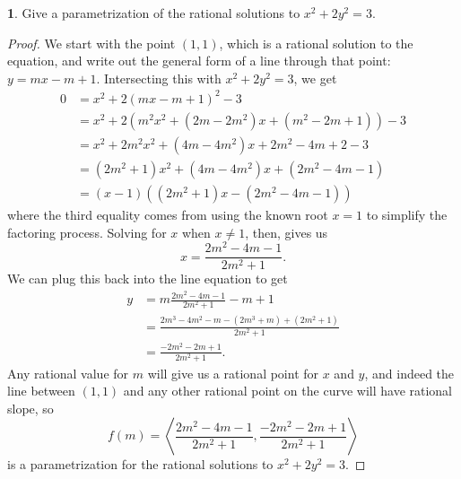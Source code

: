 \documentclass[12pt]{article}
\theoremstyle{definition}
\newtheorem{ex}{}
\begin{document}
\begin{ex}
	Give a parametrization of the rational solutions to $x^2 + 2y^2 = 3$.
\end{ex}
\begin{proof}
	We start with the point $(1, 1)$, which is a rational solution to the equation, and write out the general form of a line through that point: $y = mx - m + 1$.
	Intersecting this with $x^2 + 2y^2 = 3$, we get \begin{align*}
		0 & = x^2 + 2(mx - m + 1)^2 - 3                           \\
		  & = x^2 + 2(m^2x^2 + (2m - 2m^2)x + (m^2 - 2m + 1)) - 3 \\
		  & = x^2 + 2m^2x^2 + (4m - 4m^2)x + 2m^2 - 4m + 2 - 3    \\
		  & = (2m^2 + 1)x^2 + (4m - 4m^2)x + (2m^2 - 4m - 1)      \\
		  & = (x-1)((2m^2 + 1)x - (2m^2 - 4m - 1))
	\end{align*}
	where the third equality comes from using the known root $x=1$ to simplify the factoring process.
	Solving for $x$ when $x \neq 1$, then, gives us \begin{equation*}
		x = \frac{2m^2 - 4m - 1}{2m^2 + 1}.
	\end{equation*}
	We can plug this back into the line equation to get \begin{align*}
		y & = m\frac{2m^2 - 4m - 1}{2m^2 + 1} - m + 1                  \\
		  & = \frac{2m^3 - 4m^2 - m - (2m^3 + m) + (2m^2 + 1)}{2m^2+1} \\
		  & = \frac{-2m^2 - 2m + 1}{2m^2 + 1}.
	\end{align*}
	Any rational value for $m$ will give us a rational point for $x$ and $y$, and indeed the line between $(1, 1)$ and any other rational point on the curve will have rational slope, so \begin{equation*}
		f(m) = \left\langle \frac{2m^2 - 4m - 1}{2m^2 + 1}, \frac{-2m^2 -2m + 1}{2m^2 + 1} \right\rangle
	\end{equation*}
	is a parametrization for the rational solutions to $x^2 + 2y^2 = 3$.
\end{proof}
\end{document}
